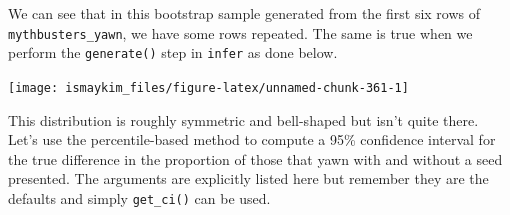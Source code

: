 \documentclass[12pt,]{krantz}
\makeatletter
\newenvironment{Shaded}{\begin{snugshade}}{\end{snugshade}}
\newcommand{\KeywordTok}[1]{\textcolor[rgb]{0.27,0.27,0.27}{\textbf{#1}}}
\newcommand{\DataTypeTok}[1]{\textcolor[rgb]{0.27,0.27,0.27}{#1}}
\newcommand{\DecValTok}[1]{\textcolor[rgb]{0.06,0.06,0.06}{#1}}
\newcommand{\FloatTok}[1]{\textcolor[rgb]{0.06,0.06,0.06}{#1}}
\newcommand{\StringTok}[1]{\textcolor[rgb]{0.5,0.5,0.5}{#1}}
\newcommand{\OperatorTok}[1]{\textcolor[rgb]{0.43,0.43,0.43}{\textbf{#1}}}
\newcommand{\NormalTok}[1]{#1}
\newenvironment{kframe}{%
\medskip{}
\setlength{\fboxsep}{.8em}
 \def\at@end@of@kframe{}%
 \ifinner\ifhmode%
  \def\at@end@of@kframe{\end{minipage}}%
  \begin{minipage}{\columnwidth}%
 \fi\fi%
 \def\FrameCommand##1{\hskip\@totalleftmargin \hskip-\fboxsep
 \colorbox{shadecolor}{##1}\hskip-\fboxsep
     \hskip-\linewidth \hskip-\@totalleftmargin \hskip\columnwidth}%
 \MakeFramed {\advance\hsize-\width
   \@totalleftmargin\z@ \linewidth\hsize
   \@setminipage}}%
 {\par\unskip\endMakeFramed%
 \at@end@of@kframe}
\renewenvironment{Shaded}{\begin{kframe}}{\end{kframe}}
\theoremstyle{definition}
\theoremstyle{definition}
\theoremstyle{definition}
\theoremstyle{remark}
\makeatother
\begin{document}
We can see that in this bootstrap sample generated from the first six
rows of \texttt{mythbusters\_yawn}, we have some rows repeated. The same
is true when we perform the \texttt{generate()} step in \texttt{infer}
as done below.

\begin{Shaded}
\end{Shaded}

\begin{Shaded}
\end{Shaded}

\begin{center}\texttt{[image: ismaykim\_files/figure-latex/unnamed-chunk-361-1]} \end{center}

This distribution is roughly symmetric and bell-shaped but isn't quite
there. Let's use the percentile-based method to compute a 95\%
confidence interval for the true difference in the proportion of those
that yawn with and without a seed presented. The arguments are
explicitly listed here but remember they are the defaults and simply
\texttt{get\_ci()} can be used.

\begin{Shaded}
\end{Shaded}
\end{document}
